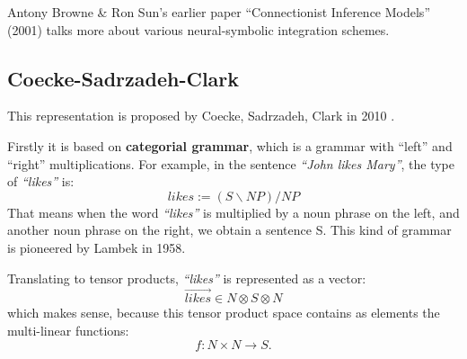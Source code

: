 \documentclass[12pt]{article}
\newcommand{\english}[1]{\rmfamily \textit{``#1''}\rmfamily}
\begin{document}
Antony Browne \& Ron Sun's earlier paper ``Connectionist Inference Models'' (2001) \cite{Browne2001} talks more about various neural-symbolic integration schemes.

\subsection{Coecke-Sadrzadeh-Clark}

This representation is proposed by Coecke, Sadrzadeh, Clark in 2010 \cite{Coecke2010}.

Firstly it is based on \textbf{categorial grammar}, which is a grammar with ``left'' and ``right'' multiplications.  For example, in the sentence \english{John likes Mary}, the type of \english{likes} is:
$$ likes := (S\backslash NP)/NP $$
That means when the word \english{likes} is multiplied by a noun phrase on the left, and another noun phrase on the right, we obtain a sentence S.  This kind of grammar is pioneered by Lambek in 1958.

Translating to tensor products, \english{likes} is represented as a vector:
$$ \overrightarrow{likes} \in N \otimes S \otimes N $$
which makes sense, because this tensor product space contains as elements the multi-linear functions:
$$ f : N \times N \rightarrow S. $$






\end{document}
